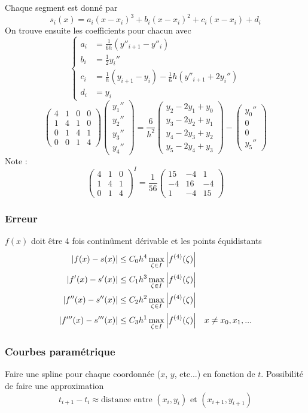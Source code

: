 \documentclass[resume]{subfiles}
\begin{document}
    Chaque segment est donné par
    $$\boxed{s_i(x)=a_i(x-x_i)^3+b_i(x-x_i)^2+c_i(x-x_i)+d_i}$$
    On trouve ensuite les coefficients pour chacun avec
	$$\begin{cases}
	a_i &= \frac{1}{6h}\left(y''_{i+1}-y''_{i}\right)\\
	b_i &= \frac{1}{2}y_i''\\
	c_i &= \frac{1}{h}\left(y_{i+1}-y_i\right)-\frac{1}{6}h\left(y''_{i+1}+2y_{i}''\right)\\
	d_i &= y_i
	\end{cases}$$
	$$\begin{pmatrix}
4 & 1 & 0 & 0\\
1 & 4 & 1 & 0\\
0 & 1 & 4 & 1\\
0 & 0 & 1 & 4
\end{pmatrix}\begin{pmatrix}
y_1''\\
y_2''\\
y_3''\\
y_4''
\end{pmatrix}=\frac{6}{h^2}\begin{pmatrix}
y_2-2y_1+y_0\\
y_3-2y_2+y_1\\
y_4-2y_3+y_2\\
y_5-2y_4+y_3
\end{pmatrix}-\begin{pmatrix}
y_0''\\
0\\
0\\
y_5''
\end{pmatrix}$$
Note :
$$\begin{pmatrix}
4 & 1 & 0\\
1 & 4 & 1\\
0 & 1 & 4
\end{pmatrix}^{I}=\frac{1}{56}\begin{pmatrix}
15 & -4 & 1\\
-4 & 16 & -4\\
1 & -4 & 15
\end{pmatrix}$$
\subsubsection{Erreur}
$f(x)$ doit être 4 fois continûment dérivable et les points équidistants
\begin{align*}
\abs{f(x)-s(x)}&\leq C_0h^4\max_{\zeta\in I}\abs{f^{(4)}(\zeta)}\\
\abs{f'(x)-s'(x)}&\leq C_1h^3\max_{\zeta\in I}\abs{f^{(4)}(\zeta)}\\
\abs{f''(x)-s''(x)}&\leq C_2h^2\max_{\zeta\in I}\abs{f^{(4)}(\zeta)}\\
\abs{f'''(x)-s'''(x)}&\leq C_3h^1\max_{\zeta\in I}\abs{f^{(4)}(\zeta)} & x\neq x_0,x_1,...
\end{align*}
\subsubsection{Courbes paramétrique}
Faire une spline pour chaque coordonnée ($x$, $y$, etc...) en fonction de $t$. Possibilité de faire une approximation
$$t_{i+1}-t_{i}\approx \text{distance entre } (x_i,y_i)\text{ et } (x_{i+1},y_{i+1})$$

    
\end{document}
